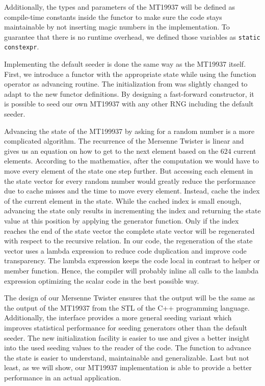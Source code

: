 \documentclass{stdlocal}
\begin{document}
    Additionally, the types and parameters of the MT19937 will be defined as compile-time constants inside the functor to make sure the code stays maintainable by not inserting magic numbers in the implementation.
    To guarantee that there is no runtime overhead, we defined those variables as \texttt{static constexpr}.

    Implementing the default seeder is done the same way as the MT19937 itself.
    First, we introduce a functor with the appropriate state while using the function operator as advancing routine.
    The initialization from \textcite{kneusel2018} was slightly changed to adapt to the new functor definitions.
    By designing a fast-forward constructor, it is possible to seed our own MT19937 with any other RNG including the default seeder.

    Advancing the state of the MT199937 by asking for a random number is a more complicated algorithm.
    The recurrence of the Mersenne Twister is linear and gives us an equation on how to get to the next element based on the $624$ current elements.
    According to the mathematics, after the computation we would have to move every element of the state one step further.
    But accessing each element in the state vector for every random number would greatly reduce the performance due to cache misses and the time to move every element.
    Instead, \citeauthor{matsumoto1998} cache the index of the current element in the state.
    While the cached index is small enough, advancing the state only results in incrementing the index and returning the state value at this position by applying the generator function.
    Only if the index reaches the end of the state vector the complete state vector will be regenerated with respect to the recursive relation.
    In our code, the regeneration of the state vector uses a lambda expression to reduce code duplication and improve code transparency.
    The lambda expression keeps the code local in contrast to helper or member function.
    Hence, the compiler will probably inline all calls to the lambda expression optimizing the scalar code in the best possible way.

    The design of our Mersenne Twister ensures that the output will be the same as the output of the MT19937 from the STL of the C++ programming language.
    Additionally, the interface provides a more general seeding variant which improves statistical performance for seeding generators other than the default seeder.
    The new initialization facility is easier to use and gives a better insight into the used seeding values to the reader of the code.
    The function to advance the state is easier to understand, maintainable and generalizable.
    Last but not least, as we will show, our MT19937 implementation is able to provide a better performance in an actual application.
\end{document}
